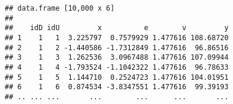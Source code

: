 \begin{Shaded}
\end{Shaded}

\begin{verbatim}
## data.frame [10,000 x 6]
## 
##    idD idU         x          e        v         y
## 1    1   1  3.225797  0.7579929 1.477616 108.68720
## 2    1   2 -1.440586 -1.7312849 1.477616  96.86516
## 3    1   3  1.262536  3.0967488 1.477616 107.09944
## 4    1   4 -1.793524 -1.1042322 1.477616  96.78633
## 5    1   5  1.144710  0.2524723 1.477616 104.01951
## 6    1   6  0.874534 -3.8347551 1.477616  99.39193
## .. ... ...       ...        ...      ...       ...
\end{verbatim}
